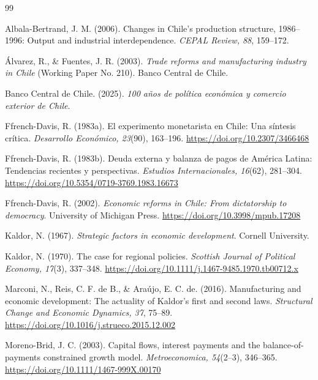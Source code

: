 \documentclass[11pt]{article}
\begin{document}
\FloatBarrier
\begin{thebibliography}{99}
\raggedright

Albala-Bertrand, J. M. (2006). Changes in Chile's production structure, 1986--1996: Output and industrial interdependence. \textit{CEPAL Review, 88}, 159--172.

Álvarez, R., \& Fuentes, J. R. (2003). \textit{Trade reforms and manufacturing industry in Chile} (Working Paper No. 210). Banco Central de Chile.

Banco Central de Chile. (2025). \textit{100 años de política económica y comercio exterior de Chile}.

Ffrench-Davis, R. (1983a). El experimento monetarista en Chile: Una síntesis crítica. \textit{Desarrollo Económico, 23}(90), 163--196. \url{https://doi.org/10.2307/3466468}

Ffrench-Davis, R. (1983b). Deuda externa y balanza de pagos de América Latina: Tendencias recientes y perspectivas. \textit{Estudios Internacionales, 16}(62), 281--304. \url{https://doi.org/10.5354/0719-3769.1983.16673}

Ffrench-Davis, R. (2002). \textit{Economic reforms in Chile: From dictatorship to democracy}. University of Michigan Press. \url{https://doi.org/10.3998/mpub.17208}

Kaldor, N. (1967). \textit{Strategic factors in economic development}. Cornell University.

Kaldor, N. (1970). The case for regional policies. \textit{Scottish Journal of Political Economy, 17}(3), 337--348. \url{https://doi.org/10.1111/j.1467-9485.1970.tb00712.x}

Marconi, N., Reis, C. F. de B., \& Araújo, E. C. de. (2016). Manufacturing and economic development: The actuality of Kaldor's first and second laws. \textit{Structural Change and Economic Dynamics, 37}, 75--89. \url{https://doi.org/10.1016/j.strueco.2015.12.002}

Moreno-Brid, J. C. (2003). Capital flows, interest payments and the balance-of-payments constrained growth model. \textit{Metroeconomica, 54}(2--3), 346--365. \url{https://doi.org/10.1111/1467-999X.00170}


\end{thebibliography}
\end{document}
